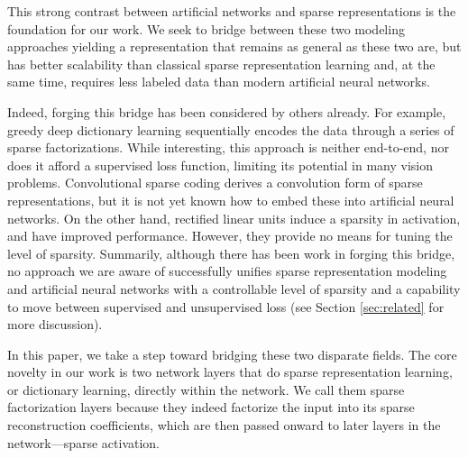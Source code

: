 \documentclass[10pt,twocolumn,letterpaper]{article}
\DeclareRobustCommand{\jason}[1]{{\hl{\;$^{\text{jason}}$ #1}}}
\begin{document}


This strong contrast between artificial networks and sparse representations is 
the foundation for our work.  We seek to bridge between these two modeling 
approaches yielding a representation that remains as general as these two are, 
but has better scalability than classical sparse representation learning and, 
at the same time, requires less labeled data than modern artificial neural 
networks.  

Indeed, forging this bridge has been considered by others already.  
For example, greedy deep dictionary learning \cite{TaMaSiarXiv2016} 
sequentially encodes the data through a series of sparse factorizations.  While 
interesting, this approach is neither end-to-end, nor does it afford a 
supervised loss function, limiting its potential in many vision problems.  
Convolutional sparse coding \cite{KaSeBoNIPS2010} derives a convolution form of 
sparse representations, but it is not yet known how to embed these into 
artificial neural networks.  On the other hand, rectified linear units 
\cite{GlBoBeAIStats2011} induce a sparsity in activation, and have improved 
performance.  However, they provide no means for tuning the level of sparsity.   
Summarily, although there has been work in forging this bridge, no approach we 
are aware of successfully unifies sparse representation modeling and artificial 
neural networks with a controllable level of sparsity and a capability to move 
between supervised and unsupervised loss (see Section \ref{sec:related} for more 
discussion). 


In this paper, we take a step toward bridging these two disparate fields.
%
The core novelty in our work is two network layers that do sparse 
representation learning, or dictionary learning, directly within the network.  
We call them sparse factorization layers because they indeed factorize the 
input into its sparse reconstruction coefficients, which are then passed onward 
to later layers in the network---sparse activation.  
\end{document}
